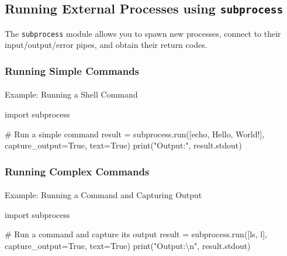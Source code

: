 \documentclass[
  letterpaper,
  DIV=11,
  numbers=noendperiod]{scrreprt}
\makeatletter
\let\oldparagraph\paragraph
\renewcommand{\paragraph}{
    \@ifstar
      \xxxParagraphStar
      \xxxParagraphNoStar
  }
\newcommand{\xxxParagraphStar}[1]{\oldparagraph*{#1}\mbox{}}
\newcommand{\xxxParagraphNoStar}[1]{\oldparagraph{#1}\mbox{}}
\newenvironment{Shaded}{\begin{snugshade}}{\end{snugshade}}
\newcommand{\BuiltInTok}[1]{\textcolor[rgb]{0.00,0.23,0.31}{#1}}
\newcommand{\CharTok}[1]{\textcolor[rgb]{0.13,0.47,0.30}{#1}}
\newcommand{\CommentTok}[1]{\textcolor[rgb]{0.37,0.37,0.37}{#1}}
\newcommand{\ImportTok}[1]{\textcolor[rgb]{0.00,0.46,0.62}{#1}}
\newcommand{\NormalTok}[1]{\textcolor[rgb]{0.00,0.23,0.31}{#1}}
\newcommand{\OperatorTok}[1]{\textcolor[rgb]{0.37,0.37,0.37}{#1}}
\newcommand{\StringTok}[1]{\textcolor[rgb]{0.13,0.47,0.30}{#1}}
\newcommand{\VariableTok}[1]{\textcolor[rgb]{0.07,0.07,0.07}{#1}}
\makeatother
\begin{document}
\subsection{\texorpdfstring{Running External Processes using
\texttt{subprocess}}{Running External Processes using subprocess}}\label{running-external-processes-using-subprocess}

The \texttt{subprocess} module allows you to spawn new processes,
connect to their input/output/error pipes, and obtain their return
codes.

\subsubsection{Running Simple Commands}\label{running-simple-commands}

\paragraph{Example: Running a Shell
Command}\label{example-running-a-shell-command}

\begin{Shaded}
\begin{Highlighting}[]
\ImportTok{import}\NormalTok{ subprocess}

\CommentTok{\# Run a simple command}
\NormalTok{result }\OperatorTok{=}\NormalTok{ subprocess.run([}\StringTok{\textquotesingle{}echo\textquotesingle{}}\NormalTok{, }\StringTok{\textquotesingle{}Hello, World!\textquotesingle{}}\NormalTok{], capture\_output}\OperatorTok{=}\VariableTok{True}\NormalTok{, text}\OperatorTok{=}\VariableTok{True}\NormalTok{)}
\BuiltInTok{print}\NormalTok{(}\StringTok{"Output:"}\NormalTok{, result.stdout)}
\end{Highlighting}
\end{Shaded}

\subsubsection{Running Complex Commands}\label{running-complex-commands}

\paragraph{Example: Running a Command and Capturing
Output}\label{example-running-a-command-and-capturing-output}

\begin{Shaded}
\begin{Highlighting}[]
\ImportTok{import}\NormalTok{ subprocess}

\CommentTok{\# Run a command and capture its output}
\NormalTok{result }\OperatorTok{=}\NormalTok{ subprocess.run([}\StringTok{\textquotesingle{}ls\textquotesingle{}}\NormalTok{, }\StringTok{\textquotesingle{}{-}l\textquotesingle{}}\NormalTok{], capture\_output}\OperatorTok{=}\VariableTok{True}\NormalTok{, text}\OperatorTok{=}\VariableTok{True}\NormalTok{)}
\BuiltInTok{print}\NormalTok{(}\StringTok{"Output:}\CharTok{\textbackslash{}n}\StringTok{"}\NormalTok{, result.stdout)}
\end{Highlighting}
\end{Shaded}
\end{document}
